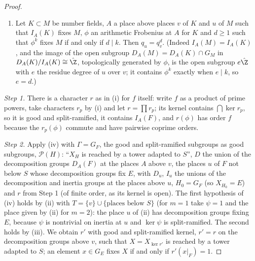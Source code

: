 \begin{proof}
\begin{enumerate}[label=(\roman*),nosep]
  subgroups, a subset $D$, and families $(D_u)$, $(I_u)$, $I_u\subset D_u$, of subsets indexed by a set of ``places''.
  Assume that for every good $U$ and $m\ge1$ there are a character $\psi$ with good kernel, $\psi^m=1$, $\psi|_D=1$, and a
  place $u$ with $D_u\subset U$ and $\psi(\tau)$ of order $m$ for some $\tau\in I_u$; and that $\mathcal P(H)$ implies
  $\mathcal P(H')$ for good $H'\subset H$ of prime index such that some place $u$ has $D_u\subset H$ and $I_u\not\subset H'$.
  Then for every good $H_0$ with $\mathcal P(H_0)$ and every character $r$ of finite order with good kernel there is a
  character $r'$ with good kernel, $r'=r$ on $D$, and $\mathcal P(H_0\cap\ker r')$.
\item Let $K\subset M$ be number fields, $A$ a place
  above places $v$ of $K$ and $u$ of $M$ such that $I_A(K)$ fixes $M$, $\phi$ an arithmetic Frobenius at $A$ for $K$ and
  $d\ge1$ such that $\phi^k$ fixes $M$ if and only if $d\mid k$. Then $q_u=q_v^d$. (Indeed $I_A(M)=I_A(K)$, and the image of
  the open subgroup $D_A(M)=D_A(K)\cap G_M$ in $D_A(K)/I_A(K)\cong\hat\Z$, topologically generated by $\phi$, is the open
  subgroup $e\hat\Z$ with $e$ the residue degree of $u$ over $v$; it contains $\phi^k$ exactly when $e\mid k$, so $e=d$.)
\end{enumerate}
\emph{Step 1.} There is a character $r$ as in (i) for $f$ itself: write $f$ as a product of prime powers, take characters
$r_p$ by (i) and let $r=\prod r_p$; its kernel contains $\bigcap\ker r_p$, so it is good and split-ramified, it contains
$I_A(F)$, and $r(\phi)$ has order $f$ because the $r_p(\phi)$ commute and have pairwise coprime orders.

\emph{Step 2.} Apply (iv) with $\Gamma=G_F$, the good and split-ramified subgroups as good subgroups, $\mathcal P(H)$:
``$X_H$ is reached by a tower adapted to $S$'', $D$ the union of the decomposition groups $D_A(F)$ at the places $A$ above
$v$, the places $u$ of $F$ not below $S$ whose decomposition groups fix $E$, with $D_u$, $I_u$ the unions of the
decomposition and inertia groups at the places above $u$, $H_0=G_F$ (so $X_{H_0}=E$) and $r$ from Step 1 (of finite
order, as its kernel is open). The first hypothesis of (iv) holds by (ii) with $T=\{v\}\cup\{\text{places below }S\}$ (for
$m=1$ take $\psi=1$ and the place given by (ii) for $m=2$): the place $u$ of (ii) has decomposition groups fixing $E$, because $\psi$ is nontrivial on inertia
at $u$ and $\ker\psi$ is split-ramified. The second holds by (iii). We obtain $r'$ with good and split-ramified kernel,
$r'=r$ on the decomposition groups above $v$, such that $X=X_{\ker r'}$ is reached by a tower adapted to $S$; an element
$x\in G_E$ fixes $X$ if and only if $r'(x|_F)=1$.


\end{proof}
